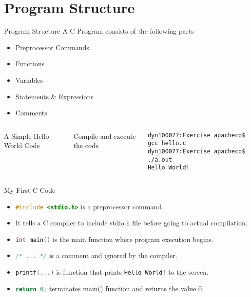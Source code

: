\documentclass[10pt,t]{beamer}
\begin{document}
\section{Program Structure}
\begin{frame}[fragile]{Program Structure}
A C Program consists of the following parts
  \begin{itemize}
    \item Preprocessor Commands
    \item Functions
    \item Variables
    \item Statements \& Expressions
    \item Comments
  \end{itemize}
  \begin{columns}
    A Simple Hello World Code
    
    Compile and execute the code
    \begin{lstlisting}[style=LINUX]
dyn100077:Exercise apacheco$ gcc hello.c 
dyn100077:Exercise apacheco$ ./a.out 
Hello World!
    \end{lstlisting}
  \end{columns}
\end{frame}

\begin{frame}[fragile]{My First C Code}
  
  \begin{itemize}
    \item \lstinline[language=C,basicstyle=\scriptsize\ttfamily]|#include <stdio.h>| is a preprocessor command.
    \item[] It tells a C compiler to include stdio.h file before going to actual compilation.
    \item \lstinline[language=C,basicstyle=\scriptsize\ttfamily]|int main()| is the main function where program execution begins.
    \item \lstinline[language=C,basicstyle=\scriptsize\ttfamily]|/* ... */| is a comment and ignored by the compiler.
    \item \lstinline[language=C,basicstyle=\scriptsize\ttfamily]|printf(...)| is function that prints \lstinline[language=C,basicstyle=\scriptsize\ttfamily]|Hello World!| to the screen.
    \item \lstinline[language=C,basicstyle=\scriptsize\ttfamily]|return 0;| terminates main() function and returns the value 0.
  \end{itemize}
\end{frame}
\end{document}
